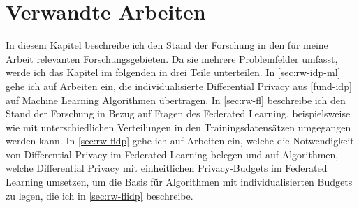 \chapter{Verwandte Arbeiten}\label{chap:related-work}


In diesem Kapitel beschreibe ich den Stand der Forschung in den für meine Arbeit relevanten Forschungsgebieten. Da sie mehrere Problemfelder umfasst, werde ich das Kapitel im folgenden in drei Teile unterteilen. In \autoref{sec:rw-idp-ml} gehe ich auf Arbeiten ein, die individualisierte Differential Privacy aus \autoref{fund-idp} auf Machine Learning Algorithmen übertragen. In \autoref{sec:rw-fl} beschreibe ich den Stand der Forschung in Bezug auf Fragen des Federated Learning, beispielsweise wie mit unterschiedlichen Verteilungen in den Trainingsdatensätzen umgegangen werden kann. In \autoref{sec:rw-fldp} gehe ich auf Arbeiten ein, welche die Notwendigkeit von Differential Privacy im Federated Learning belegen und auf Algorithmen, welche Differential Privacy mit einheitlichen Privacy-Budgets im Federated Learning umsetzen, um die Basis für Algorithmen mit individualisierten Budgets zu legen, die ich in \autoref{sec:rw-flidp} beschreibe.

